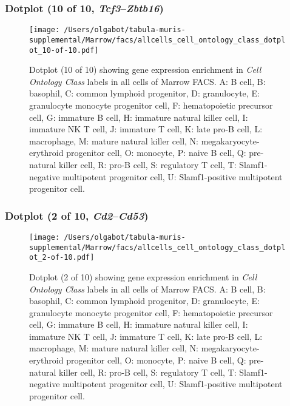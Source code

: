 \subsubsection{Dotplot (10 of 10, \emph{Tcf3}--\emph{Zbtb16})}
\begin{figure}[h]
\centering
\texttt{[image: /Users/olgabot/tabula-muris-supplemental/Marrow/facs/allcells\_cell\_ontology\_class\_dotplot\_10-of-10.pdf]}

\caption{ Dotplot (10 of 10)  showing gene expression enrichment in \emph{Cell Ontology Class} labels in all cells of Marrow FACS. A: B cell, B: basophil, C: common lymphoid progenitor, D: granulocyte, E: granulocyte monocyte progenitor cell, F: hematopoietic precursor cell, G: immature B cell, H: immature natural killer cell, I: immature NK T cell, J: immature T cell, K: late pro-B cell, L: macrophage, M: mature natural killer cell, N: megakaryocyte-erythroid progenitor cell, O: monocyte, P: naive B cell, Q: pre-natural killer cell, R: pro-B cell, S: regulatory T cell, T: Slamf1-negative multipotent progenitor cell, U: Slamf1-positive multipotent progenitor cell.}
\end{figure}


\clearpage

\subsubsection{Dotplot (2 of 10, \emph{Cd2}--\emph{Cd53})}
\begin{figure}[h]
\centering
\texttt{[image: /Users/olgabot/tabula-muris-supplemental/Marrow/facs/allcells\_cell\_ontology\_class\_dotplot\_2-of-10.pdf]}

\caption{ Dotplot (2 of 10)  showing gene expression enrichment in \emph{Cell Ontology Class} labels in all cells of Marrow FACS. A: B cell, B: basophil, C: common lymphoid progenitor, D: granulocyte, E: granulocyte monocyte progenitor cell, F: hematopoietic precursor cell, G: immature B cell, H: immature natural killer cell, I: immature NK T cell, J: immature T cell, K: late pro-B cell, L: macrophage, M: mature natural killer cell, N: megakaryocyte-erythroid progenitor cell, O: monocyte, P: naive B cell, Q: pre-natural killer cell, R: pro-B cell, S: regulatory T cell, T: Slamf1-negative multipotent progenitor cell, U: Slamf1-positive multipotent progenitor cell.}
\end{figure}


\clearpage

